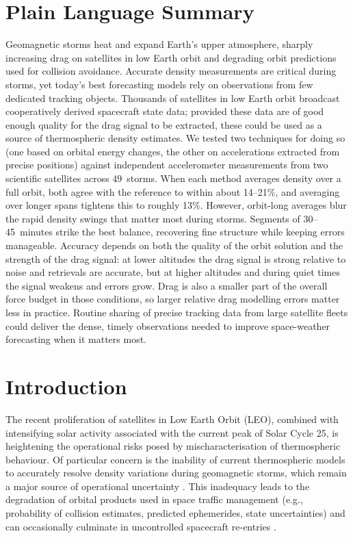 \documentclass{agujournal2019}
\begin{document}
\section*{Plain Language Summary}
Geomagnetic storms heat and expand Earth's upper atmosphere, sharply increasing drag on satellites in low Earth orbit and degrading orbit predictions used for collision avoidance. Accurate density measurements are critical during storms, yet today's best forecasting models rely on observations from few dedicated tracking objects. Thousands of satellites in low Earth orbit broadcast cooperatively derived spacecraft state data; provided these data are of good enough quality for the drag signal to be extracted, these could be used as a source of thermospheric density estimates. We tested two techniques for doing so (one based on orbital energy changes, the other on accelerations extracted from precise positions) against independent accelerometer measurements from two scientific satellites across 49~storms. When each method averages density over a full orbit, both agree with the reference to within about 14--21\%, and averaging over longer spans tightens this to roughly 13\%. However, orbit-long averages blur the rapid density swings that matter most during storms. Segments of 30--45~minutes strike the best balance, recovering fine structure while keeping errors manageable. Accuracy depends on both the quality of the orbit solution and the strength of the drag signal: at lower altitudes the drag signal is strong relative to noise and retrievals are accurate, but at higher altitudes and during quiet times the signal weakens and errors grow. Drag is also a smaller part of the overall force budget in those conditions, so larger relative drag modelling errors matter less in practice. Routine sharing of precise tracking data from large satellite fleets could deliver the dense, timely observations needed to improve space-weather forecasting when it matters most.

\section{Introduction}

The recent proliferation of satellites in Low Earth Orbit (LEO), combined with intensifying solar activity associated with the current peak of Solar Cycle 25, is heightening the operational risks posed by mischaracterisation of thermospheric behaviour. Of particular concern is the inability of current thermospheric models to accurately resolve density variations during geomagnetic storms, which remain a major source of operational uncertainty \cite{Mehta2017AAtmosphere}. This inadequacy leads to the degradation of orbital products used in space traffic management (e.g., probability of collision estimates, predicted ephemerides, state uncertainties) \cite{Bussy-Virat2018} and can occasionally culminate in uncontrolled spacecraft re-entries \cite{Fang2022Space2022}.
\end{document}
